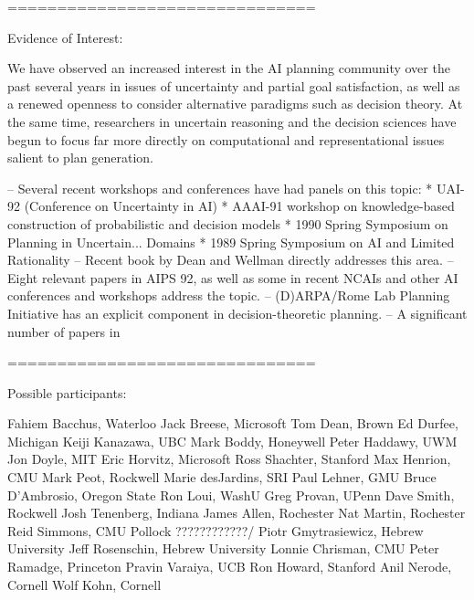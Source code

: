 ===============================

Evidence of Interest:

We have observed an increased interest in the AI planning community over
the past several years in issues of uncertainty and partial goal
satisfaction, as well as a renewed openness to consider alternative
paradigms such as decision theory.  At the same time, researchers in
uncertain reasoning and the decision sciences have begun to focus far more
directly on computational and representational issues salient to plan
generation.  

  -- Several recent workshops and conferences have had 
     panels on this topic:
       *  UAI-92 (Conference on Uncertainty in AI)
       *  AAAI-91 workshop on knowledge-based construction of 
          probabilistic and decision models
       *  1990 Spring Symposium on Planning in Uncertain... Domains
       *  1989 Spring Symposium on AI and Limited Rationality
  -- Recent book by Dean and Wellman directly addresses this area.
  -- Eight relevant papers in AIPS 92, as well as some in recent
     NCAIs and other AI conferences and workshops address the topic.
  -- (D)ARPA/Rome Lab Planning Initiative has an explicit component in
     decision-theoretic planning.
  -- A significant number of papers in 

===============================

Possible participants:  

  Fahiem Bacchus, Waterloo
  Jack Breese, Microsoft
  Tom Dean, Brown
  Ed Durfee, Michigan
  Keiji Kanazawa, UBC
  Mark Boddy, Honeywell
  Peter Haddawy, UWM
  Jon Doyle, MIT
  Eric Horvitz, Microsoft
  Ross Shachter, Stanford
  Max Henrion, CMU
  Mark Peot, Rockwell
  Marie desJardins, SRI
  Paul Lehner, GMU
  Bruce D'Ambrosio, Oregon State
  Ron Loui, WashU
  Greg Provan, UPenn
  Dave Smith, Rockwell
  Josh Tenenberg, Indiana
  James Allen, Rochester
  Nat Martin, Rochester
  Reid Simmons, CMU
  Pollock                   ????????????/
  Piotr Gmytrasiewicz, Hebrew University
  Jeff Rosenschin, Hebrew University
  Lonnie Chrisman, CMU
  Peter Ramadge, Princeton
  Pravin Varaiya, UCB
  Ron Howard, Stanford
  Anil Nerode, Cornell
  Wolf Kohn, Cornell


  


